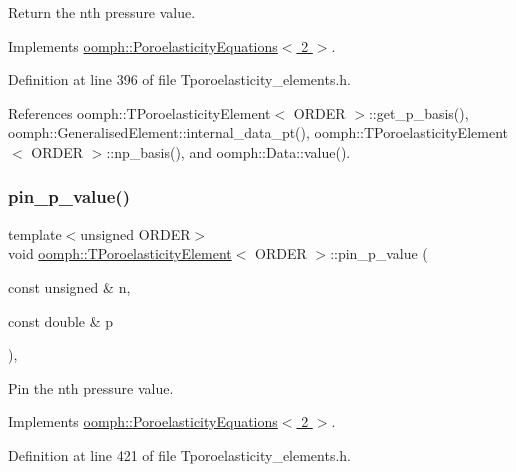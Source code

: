 Return the nth pressure value. 



Implements \hyperlink{classoomph_1_1PoroelasticityEquations_abe547474535cb139acd45cc69e251516}{oomph\+::\+Poroelasticity\+Equations$<$ 2 $>$}.



Definition at line 396 of file Tporoelasticity\+\_\+elements.\+h.



References oomph\+::\+T\+Poroelasticity\+Element$<$ O\+R\+D\+E\+R $>$\+::get\+\_\+p\+\_\+basis(), oomph\+::\+Generalised\+Element\+::internal\+\_\+data\+\_\+pt(), oomph\+::\+T\+Poroelasticity\+Element$<$ O\+R\+D\+E\+R $>$\+::np\+\_\+basis(), and oomph\+::\+Data\+::value().

\mbox{\label{classoomph_1_1TPoroelasticityElement_a0f5b5101a7e1a8a0dd6ac42eb53c037e}} 
\subsubsection{\texorpdfstring{pin\+\_\+p\+\_\+value()}{pin\_p\_value()}}
{\footnotesize\ttfamily template$<$unsigned O\+R\+D\+ER$>$ \\
void \hyperlink{classoomph_1_1TPoroelasticityElement}{oomph\+::\+T\+Poroelasticity\+Element}$<$ O\+R\+D\+ER $>$\+::pin\+\_\+p\+\_\+value (\begin{DoxyParamCaption}\item[{const unsigned \&}]{n,  }\item[{const double \&}]{p }\end{DoxyParamCaption})\hspace{0.3cm}{\ttfamily [inline]}, {\ttfamily [virtual]}}



Pin the nth pressure value. 



Implements \hyperlink{classoomph_1_1PoroelasticityEquations_a66ba2228e7e673865b11099e184496ce}{oomph\+::\+Poroelasticity\+Equations$<$ 2 $>$}.



Definition at line 421 of file Tporoelasticity\+\_\+elements.\+h.



